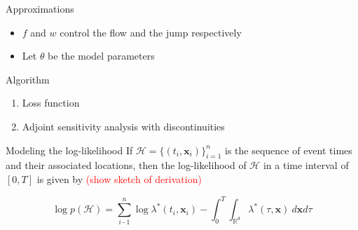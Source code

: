 \documentclass{beamer}
\begin{document}
\begin{frame}{Approximations}
\begin{itemize}
    \item $f$ and $w$ control the flow and the jump respectively

    \item Let $\theta$ be the model parameters
\end{itemize}
    
\end{frame}

\begin{frame}{Algorithm}
    \begin{enumerate}
        \item Loss function

        \item Adjoint sensitivity analysis with discontinuities
    \end{enumerate}
\end{frame}












\begin{frame}{Modeling the log-likelihood}
If $\mathcal{H}=\{(t_i,\boldsymbol{x}_i)\}_{i=1}^n$ is the sequence of event times and their associated locations, 
then the log-likelihood of $\mathcal{H}$ in a time interval of $[0, T]$ is given by \textcolor{red}{(show sketch of derivation)}

\begin{equation*}
    \log p\left(\mathcal{H}\right)=\sum_{i\operatorname{-}1}^n\log\lambda^*(t_i,\boldsymbol{x}_i)-\int_0^T\int_{\mathbb{R}^d}\lambda^*(\tau,\boldsymbol{x})\mathrm{~}d\boldsymbol{x}d\tau 
\end{equation*}
\end{frame}
\end{document}
